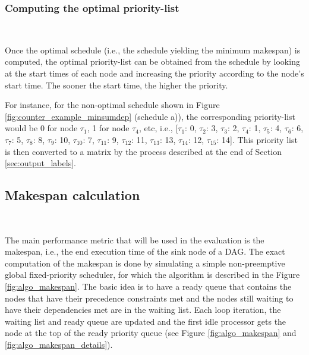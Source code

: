 \subsubsection{Computing the optimal priority-list}
~

Once the optimal schedule (i.e., the schedule yielding the minimum makespan)
is computed,
the optimal priority-list can be obtained from the schedule 
by looking at the start times of each node and increasing the priority 
according to the node's start time.
The sooner the start time, the higher the priority.

For instance, for the non-optimal schedule shown in Figure \ref{fig:counter_example_minsumdep} (schedule a)),
the corresponding priority-list would be 0 for node $\tau_1$, 1 for node $\tau_4$,
etc, i.e., [$\tau_1$: 0, $\tau_2$: 3, $\tau_3$: 2, $\tau_4$: 1, $\tau_5$: 4, $\tau_6$: 6, $\tau_7$: 5, $\tau_8$: 8,
 $\tau_9$: 10, $\tau_10$: 7, $\tau_11$: 9, $\tau_12$: 11, $\tau_13$: 13, $\tau_14$: 12, $\tau_15$: 14].
This priority list is then converted to a matrix by the process described
at the end of Section \ref{sec:output_labels}.

\subsection{Makespan calculation}
~
\label{sec:makespan_calculation}

The main performance metric that will be used in the evaluation
is the makespan, i.e., the end execution time of the sink node of a DAG.
The exact computation of the makespan is done by simulating a 
simple non-preemptive global fixed-priority scheduler, for which the algorithm
is described in the Figure \ref{fig:algo_makespan}.
The basic idea is to have a ready queue that contains the nodes
that have their precedence constraints met
and the nodes still waiting to have their dependencies met 
are in the waiting list. Each loop iteration, the waiting list and ready queue
are updated and the first idle processor gets the node at the top of 
the ready priority queue (see Figure \ref{fig:algo_makespan} and \ref{fig:algo_makespan_details}).


